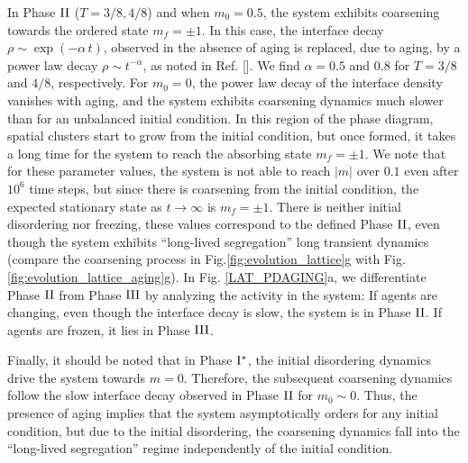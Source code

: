 In Phase ${\rm II}$ ($T=3/8, 4/8$) and when $m_0=0.5$, the system exhibits coarsening towards the ordered state $m_f=\pm 1$. In this case, the interface decay $\rho \sim \exp(-\alpha \, t)$, observed in the absence of aging is replaced, due to aging, by a power law decay $\rho \sim t^{-\alpha}$, as noted in Ref. []. We find $\alpha=0.5$ and $0.8$ for $T=3/8$ and $4/8$, respectively. For $m_0=0$, the power law decay of the interface density vanishes with aging, and the system exhibits coarsening dynamics much slower than for an unbalanced initial condition. In this region of the phase diagram, spatial clusters start to grow from the initial condition, but once formed, it takes a long time for the system to reach the absorbing state $m_f = \pm 1$. 
We note that for these parameter values, the system is not able to reach $|m|$ over $0.1$ even after $10^6$ time steps, but since there is coarsening from the initial condition, the expected stationary state as $t \to \infty$ is $m_f=\pm1$. There is neither initial disordering nor freezing, these values correspond to the defined Phase ${\rm II}$, even though the system exhibits ``long-lived segregation'' long transient dynamics (compare the coarsening process in Fig.\ref{fig:evolution_lattice}g with Fig.\ref{fig:evolution_lattice_aging}g). In Fig. \ref{LAT_PDAGING}a, we differentiate Phase ${\rm II}$ from Phase ${\rm III}$ by analyzing the activity in the system: If agents are changing, even though the interface decay is slow, the system is in Phase ${\rm II}$. If agents are frozen, it lies in Phase ${\rm III}$. %

Finally, it should be noted that in Phase ${\rm I}^{*}$, the initial disordering dynamics drive the system towards $m=0$. Therefore, the subsequent coarsening dynamics follow the slow interface decay observed in Phase ${\rm II}$ for $m_0 \sim 0$. Thus, the presence of aging implies that the system asymptotically orders for any initial condition, but due to the initial disordering, the coarsening dynamics fall into the ``long-lived segregation'' regime independently of the initial condition. 


